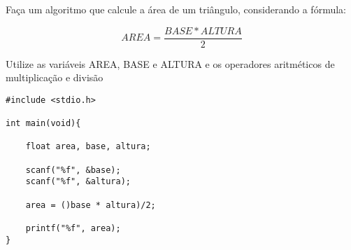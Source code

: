 
\question[10]

Faça um algoritmo que calcule a área de um triângulo, considerando a fórmula:

\begin{equation}
	AREA = \frac{BASE*ALTURA}{2}
\end{equation}

Utilize as variáveis AREA, BASE e ALTURA e os operadores aritméticos de multiplicação e divisão

\begin{solution}
\begin{lstlisting}
#include <stdio.h>

int main(void){

	float area, base, altura;
	
	scanf("%f", &base);
	scanf("%f", &altura);
	
	area = ()base * altura)/2;
	
	printf("%f", area);
}
\end{lstlisting}
\end{solution}

